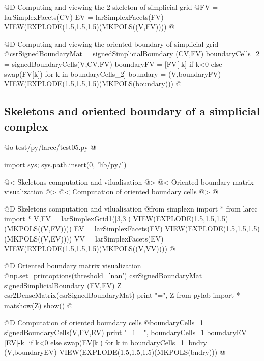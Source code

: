 \documentclass[11pt,oneside]{article}	%
\begin{document}
@D Computing and viewing the 2-skeleton of simplicial grid
@{FV = larSimplexFacets(CV)
EV = larSimplexFacets(FV)
VIEW(EXPLODE(1.5,1.5,1.5)(MKPOLS((V,FV))))
@}

@D Computing and viewing the oriented boundary of simplicial grid
@{csrSignedBoundaryMat = signedSimplicialBoundary (CV,FV)
boundaryCells_2 = signedBoundaryCells(V,CV,FV)
boundaryFV = [FV[-k] if k<0 else swap(FV[k]) for k in boundaryCells_2]
boundary = (V,boundaryFV)
VIEW(EXPLODE(1.5,1.5,1.5)(MKPOLS(boundary)))
@}


\subsection{Skeletons and oriented boundary of a simplicial complex}


@o test/py/larcc/test05.py
@{import sys; sys.path.insert(0, 'lib/py/')

@< Skeletons computation and vilualisation @>
@< Oriented boundary matrix visualization @>
@< Computation of oriented boundary cells @>
@}


@D Skeletons computation and vilualisation
@{from simplexn import *
from larcc import *
V,FV = larSimplexGrid1([3,3])
VIEW(EXPLODE(1.5,1.5,1.5)(MKPOLS((V,FV))))
EV = larSimplexFacets(FV)
VIEW(EXPLODE(1.5,1.5,1.5)(MKPOLS((V,EV))))
VV = larSimplexFacets(EV)
VIEW(EXPLODE(1.5,1.5,1.5)(MKPOLS((V,VV))))
@}

@D Oriented boundary matrix visualization
@{np.set_printoptions(threshold='nan')
csrSignedBoundaryMat = signedSimplicialBoundary (FV,EV)
Z = csr2DenseMatrix(csrSignedBoundaryMat)
print "\ncsrSignedBoundaryMat =\n", Z
from pylab import *
matshow(Z)
show()
@}

@D Computation of oriented boundary cells 
@{boundaryCells_1 = signedBoundaryCells(V,FV,EV)
print "\nboundaryCells_1 =\n", boundaryCells_1
boundaryEV = [EV[-k] if k<0 else swap(EV[k]) for k in boundaryCells_1]
bndry = (V,boundaryEV)
VIEW(EXPLODE(1.5,1.5,1.5)(MKPOLS(bndry)))
@}
\end{document}
